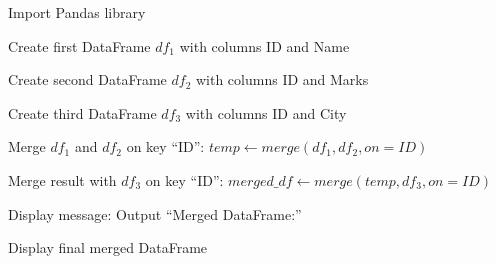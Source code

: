 \begin{algorithm}
\caption{Merge Three DataFrames on a Common Key using Pandas}
\begin{algorithmic}[1]

\STATE Import Pandas library

\STATE Create first DataFrame $df_1$ with columns ID and Name

\STATE Create second DataFrame $df_2$ with columns ID and Marks

\STATE Create third DataFrame $df_3$ with columns ID and City

\STATE Merge $df_1$ and $df_2$ on key ``ID'':
\STATE $temp \gets merge(df_1, df_2, on=ID)$

\STATE Merge result with $df_3$ on key ``ID'':
\STATE $merged\_df \gets merge(temp, df_3, on=ID)$

\STATE Display message:
\STATE Output ``Merged DataFrame:''

\STATE Display final merged DataFrame

\end{algorithmic}
\end{algorithm}